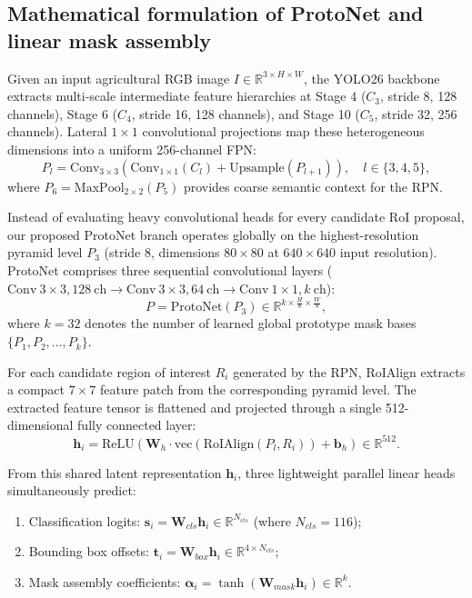 \documentclass[5p,times]{elsarticle}
\begin{document}
\subsection{Mathematical formulation of ProtoNet and linear mask assembly}
Given an input agricultural RGB image $I \in \mathbb{R}^{3 \times H \times W}$, the YOLO26 backbone extracts multi-scale intermediate feature hierarchies at Stage 4 ($C_3$, stride 8, 128 channels), Stage 6 ($C_4$, stride 16, 128 channels), and Stage 10 ($C_5$, stride 32, 256 channels). Lateral $1 \times 1$ convolutional projections map these heterogeneous dimensions into a uniform 256-channel FPN:
\begin{equation}
    P_l = \mathrm{Conv}_{3 \times 3}\left(\mathrm{Conv}_{1 \times 1}(C_l) + \mathrm{Upsample}(P_{l+1})\right), \quad l \in \{3, 4, 5\},
\end{equation}
where $P_6 = \mathrm{MaxPool}_{2 \times 2}(P_5)$ provides coarse semantic context for the RPN.

Instead of evaluating heavy convolutional heads for every candidate RoI proposal, our proposed ProtoNet branch operates globally on the highest-resolution pyramid level $P_3$ (stride 8, dimensions $80 \times 80$ at $640 \times 640$ input resolution). ProtoNet comprises three sequential convolutional layers ($\mathrm{Conv}\ 3 \times 3, 128\mathrm{\ ch} \rightarrow \mathrm{Conv}\ 3 \times 3, 64\mathrm{\ ch} \rightarrow \mathrm{Conv}\ 1 \times 1, k\mathrm{\ ch}$):
\begin{equation}
    P = \mathrm{ProtoNet}(P_3) \in \mathbb{R}^{k \times \frac{H}{8} \times \frac{W}{8}},
\end{equation}
where $k = 32$ denotes the number of learned global prototype mask bases $\{P_1, P_2, \dots, P_k\}$.

For each candidate region of interest $R_i$ generated by the RPN, RoIAlign extracts a compact $7 \times 7$ feature patch from the corresponding pyramid level. The extracted feature tensor is flattened and projected through a single 512-dimensional fully connected layer:
\begin{equation}
    \mathbf{h}_i = \mathrm{ReLU}\left(\mathbf{W}_h \cdot \mathrm{vec}(\mathrm{RoIAlign}(P_l, R_i)) + \mathbf{b}_h\right) \in \mathbb{R}^{512}.
\end{equation}

From this shared latent representation $\mathbf{h}_i$, three lightweight parallel linear heads simultaneously predict:
\begin{enumerate}
    \item Classification logits: $\mathbf{s}_i = \mathbf{W}_{cls} \mathbf{h}_i \in \mathbb{R}^{N_{cls}}$ (where $N_{cls} = 116$);
    \item Bounding box offsets: $\mathbf{t}_i = \mathbf{W}_{box} \mathbf{h}_i \in \mathbb{R}^{4 \times N_{cls}}$;
    \item Mask assembly coefficients: $\boldsymbol{\alpha}_i = \tanh(\mathbf{W}_{mask} \mathbf{h}_i) \in \mathbb{R}^k$.
\end{enumerate}
\end{document}
